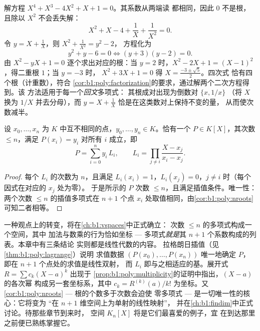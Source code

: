 \begin{example}[回文方程]\label{ex:b1:poly:palindrome}
解方程 $X^4 + X^3 - 4X^2 + X + 1 = 0$。其系数从两端读
都相同，因此 $0$ 不是根，且除以
$X^2$ 不会丢失解：
\[
X^2 + X - 4 + \frac1X + \frac1{X^2} = 0 .
\]
令 $y = X + \frac1X$，则 $X^2 + \frac1{X^2} = y^2 - 2$，
方程化为
\[
y^2 + y - 6 = 0 \iff (y + 3)(y - 2) = 0 .
\]
由 $X^2 - yX + 1 = 0$ 逐个求出对应的根：当 $y = 2$ 时，$X^2 -
2X + 1 = (X - 1)^2$，得二重根 $1$；当 $y = -3$ 时，
$X^2 + 3X + 1 = 0$ 得 $X = \frac{-3 \pm \sqrt5}2$。四次式
恰有四个根（计重数），符合
\cref{cor:b1:poly:factorization}的要求，通过解两个二次方程得到。该
方法适用于每一个\emph{回文}多项式：
其根成对出现为倒数对 $\{x, 1/x\}$
（将 $X$ 换为 $1/X$ 并去分母），而 $y = X +
\frac1X$ 恰是在这类数对上保持不变的量，
从而使次数减半。
\end{example}

\begin{theorem}[拉格朗日插值]\label{thm:b1:poly:lagrange}
设 $x_0, \dots, x_n$ 为 $K$ 中互不相同的点，$y_0, \dots, y_n
\in K$。恰有一个 $P \in K[X]$，其次数 $\leq n$，满足
$P(x_i) = y_i$ 对所有 $i$ 成立，即
\[
P = \sum_{i=0}^{n} y_i\, L_i,
\qquad
L_i = \prod_{j \neq i} \frac{X - x_j}{x_i - x_j} .
\]
\end{theorem}

\begin{proof}
每个 $L_i$ 的次数为 $n$，且满足 $L_i(x_i) = 1$，$L_i(x_j) =
0$，$j \neq i$ 时（每个因式在对应的 $x_j$ 处为零）。
于是所示的 $P$ 次数 $\leq n$，且满足插值条件。唯一性：
两个次数 $\leq n$ 的插值多项式在 $n+1$
个点 $x_i$ 处取值相同，由\cref{cor:b1:poly:nroots}可知二者相等。
\end{proof}

\begin{remark}[插曲：多项式也是向量]\label{rem:b1:poly:interlude}
一种观点上的转变，将在\cref{ch:b1:vspaces}中正式确立：
次数 $\leq n$ 的多项式构成一个空间，其中
加法与数乘的行为恰如坐标 ---
多项式\emph{就是}其 $n + 1$ 个系数构成的列表。本章中有三条结论
实则都是线性代数的内容。
拉格朗日插值（见\cref{thm:b1:poly:lagrange}）说明
求值数据 $(P(x_0), \dots, P(x_n))$ 唯一地确定 $P$，
即在 $n + 1$ 个点处的求值是线性双射，
而 $L_i$ 即与之相适应的基。展开式 $R =
\sum c_k(X - a)^k$ 出现于
\cref{prop:b1:poly:multiplicity}的证明中指出，$(X - a)$ 的各次幂
构成另一套坐标系，其中 $c_k =
R^{(k)}(a)/k!$ 为坐标。又
\cref{cor:b1:poly:nroots} --- 根的个数多于次数会迫使
零多项式 --- 是一切唯一性的核心：它将变为
“在 $n + 1$ 维空间上为单射的线性映射”，
并在\cref{ch:b1:findim}中正式讨论。待那些章节到来时，
空间 $K_n[X]$ 将是它们最喜爱的例子，宜
在到达那里之前便已熟练掌握它。
\end{remark}

